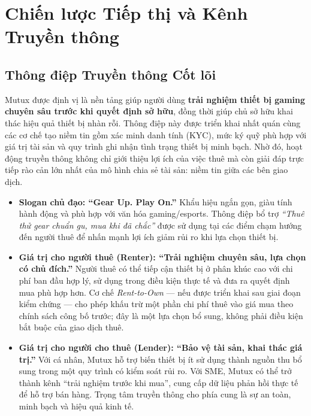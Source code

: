 \section{Chiến lược Tiếp thị và Kênh Truyền thông}

\subsection{Thông điệp Truyền thông Cốt lõi}

Mutux được định vị là nền tảng giúp người dùng \textbf{trải nghiệm thiết bị gaming chuyên sâu trước khi quyết định sở hữu}, đồng thời giúp chủ sở hữu khai thác hiệu quả thiết bị nhàn rỗi. Thông điệp này được triển khai nhất quán cùng các cơ chế tạo niềm tin gồm xác minh danh tính (KYC), mức ký quỹ phù hợp với giá trị tài sản và quy trình ghi nhận tình trạng thiết bị minh bạch. Nhờ đó, hoạt động truyền thông không chỉ giới thiệu lợi ích của việc thuê mà còn giải đáp trực tiếp rào cản lớn nhất của mô hình chia sẻ tài sản: niềm tin giữa các bên giao dịch.

\begin{itemize}
    \item \textbf{Slogan chủ đạo: ``Gear Up. Play On.''} Khẩu hiệu ngắn gọn, giàu tính hành động và phù hợp với văn hóa gaming/esports. Thông điệp bổ trợ \textit{``Thuê thử gear chuẩn gu, mua khi đã chắc''} được sử dụng tại các điểm chạm hướng đến người thuê để nhấn mạnh lợi ích giảm rủi ro khi lựa chọn thiết bị.

    \item \textbf{Giá trị cho người thuê (Renter): ``Trải nghiệm chuyên sâu, lựa chọn có chủ đích.''} Người thuê có thể tiếp cận thiết bị ở phân khúc cao với chi phí ban đầu hợp lý, sử dụng trong điều kiện thực tế và đưa ra quyết định mua phù hợp hơn. Cơ chế \textit{Rent-to-Own} --- nếu được triển khai sau giai đoạn kiểm chứng --- cho phép khấu trừ một phần chi phí thuê vào giá mua theo chính sách công bố trước; đây là một lựa chọn bổ sung, không phải điều kiện bắt buộc của giao dịch thuê.

    \item \textbf{Giá trị cho người cho thuê (Lender): ``Bảo vệ tài sản, khai thác giá trị.''} Với cá nhân, Mutux hỗ trợ biến thiết bị ít sử dụng thành nguồn thu bổ sung trong một quy trình có kiểm soát rủi ro. Với SME, Mutux có thể trở thành kênh ``trải nghiệm trước khi mua'', cung cấp dữ liệu phản hồi thực tế để hỗ trợ bán hàng. Trọng tâm truyền thông cho phía cung là sự an toàn, minh bạch và hiệu quả kinh tế.
\end{itemize}

